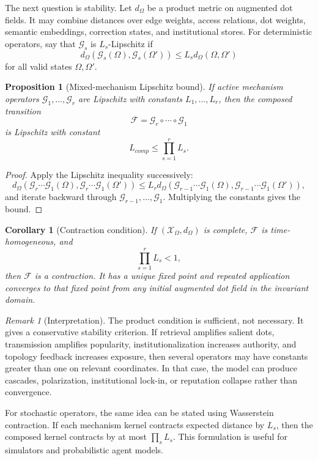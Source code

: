 \documentclass[11pt]{article}
\newtheorem{proposition}{Proposition}
\newtheorem{corollary}{Corollary}
\theoremstyle{remark}
\newtheorem{remark}{Remark}
\begin{document}
The next question is stability. Let \(d_\Omega\) be a product metric on augmented dot fields. It may combine distances over edge weights, access relations, dot weights, semantic embeddings, correction states, and institutional stores. For deterministic operators, say that \(\mathscr G_s\) is \(L_s\)-Lipschitz if
\[
d_\Omega(\mathscr G_s(\Omega),\mathscr G_s(\Omega'))\leq L_s d_\Omega(\Omega,\Omega')
\]
for all valid states \(\Omega,\Omega'\).

\begin{proposition}[Mixed-mechanism Lipschitz bound]
If active mechanism operators \(\mathscr G_1,\ldots,\mathscr G_r\) are Lipschitz with constants \(L_1,\ldots,L_r\), then the composed transition
\[
\mathscr F=\mathscr G_r\circ\cdots\circ\mathscr G_1
\]
is Lipschitz with constant
\[
L_{comp}\leq\prod_{s=1}^r L_s.
\]
\end{proposition}

\begin{proof}
Apply the Lipschitz inequality successively:
\[
d_\Omega(\mathscr G_r\cdots\mathscr G_1(\Omega),\mathscr G_r\cdots\mathscr G_1(\Omega'))
\leq L_r d_\Omega(\mathscr G_{r-1}\cdots\mathscr G_1(\Omega),\mathscr G_{r-1}\cdots\mathscr G_1(\Omega')),
\]
and iterate backward through \(\mathscr G_{r-1},\ldots,\mathscr G_1\). Multiplying the constants gives the bound.
\end{proof}

\begin{corollary}[Contraction condition]
If \((\mathcal X_\Omega,d_\Omega)\) is complete, \(\mathscr F\) is time-homogeneous, and
\[
\prod_{s=1}^r L_s<1,
\]
then \(\mathscr F\) is a contraction. It has a unique fixed point and repeated application converges to that fixed point from any initial augmented dot field in the invariant domain.
\end{corollary}

\begin{remark}[Interpretation]
The product condition is sufficient, not necessary. It gives a conservative stability criterion. If retrieval amplifies salient dots, transmission amplifies popularity, institutionalization increases authority, and topology feedback increases exposure, then several operators may have constants greater than one on relevant coordinates. In that case, the model can produce cascades, polarization, institutional lock-in, or reputation collapse rather than convergence.
\end{remark}

For stochastic operators, the same idea can be stated using Wasserstein contraction. If each mechanism kernel contracts expected distance by \(L_s\), then the composed kernel contracts by at most \(\prod_s L_s\). This formulation is useful for simulators and probabilistic agent models.
\end{document}
